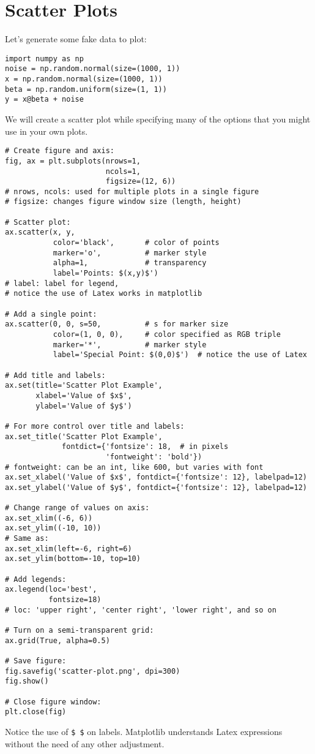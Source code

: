 \documentclass[12pt, a4paper]{article}
\begin{document}
\section{Scatter Plots}
\label{sec:org7711c3a}
Let's generate some fake data to plot:
\lstset{language=jupyter-python,label= ,caption= ,captionpos=b,numbers=none}
\begin{lstlisting}
import numpy as np
noise = np.random.normal(size=(1000, 1))
x = np.random.normal(size=(1000, 1))
beta = np.random.uniform(size=(1, 1))
y = x@beta + noise
\end{lstlisting}
We will create a scatter plot while specifying many of the options that you might use in your own plots.
\lstset{language=jupyter-python,label= ,caption= ,captionpos=b,numbers=none}
\begin{lstlisting}
# Create figure and axis:
fig, ax = plt.subplots(nrows=1,
                       ncols=1,
                       figsize=(12, 6))
# nrows, ncols: used for multiple plots in a single figure
# figsize: changes figure window size (length, height)

# Scatter plot:
ax.scatter(x, y,
           color='black',       # color of points
           marker='o',          # marker style
           alpha=1,             # transparency
           label='Points: $(x,y)$')
# label: label for legend,
# notice the use of Latex works in matplotlib

# Add a single point:
ax.scatter(0, 0, s=50,          # s for marker size
           color=(1, 0, 0),     # color specified as RGB triple
           marker='*',          # marker style
           label='Special Point: $(0,0)$')  # notice the use of Latex

# Add title and labels:
ax.set(title='Scatter Plot Example',
       xlabel='Value of $x$',
       ylabel='Value of $y$')

# For more control over title and labels:
ax.set_title('Scatter Plot Example',
             fontdict={'fontsize': 18,  # in pixels
                       'fontweight': 'bold'})
# fontweight: can be an int, like 600, but varies with font
ax.set_xlabel('Value of $x$', fontdict={'fontsize': 12}, labelpad=12)
ax.set_ylabel('Value of $y$', fontdict={'fontsize': 12}, labelpad=12)

# Change range of values on axis:
ax.set_xlim((-6, 6))
ax.set_ylim((-10, 10))
# Same as:
ax.set_xlim(left=-6, right=6)
ax.set_ylim(bottom=-10, top=10)

# Add legends:
ax.legend(loc='best',
          fontsize=18)
# loc: 'upper right', 'center right', 'lower right', and so on

# Turn on a semi-transparent grid:
ax.grid(True, alpha=0.5)

# Save figure:
fig.savefig('scatter-plot.png', dpi=300)
fig.show()

# Close figure window:
plt.close(fig)
\end{lstlisting}
Notice the use of \texttt{\$ \$} on labels.
Matplotlib understands Latex expressions without the need of any other adjustment.
\end{document}
